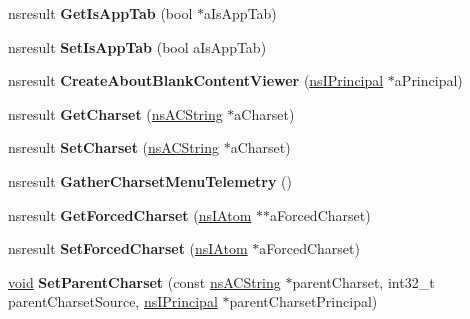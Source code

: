\begin{DoxyCompactItemize}
nsresult {\bfseries Get\+Is\+App\+Tab} (bool $\ast$a\+Is\+App\+Tab)
\item 
\mbox{\label{interfacens_i_doc_shell_aa9b845470e66e95f0585145dbbcc8901}} 
nsresult {\bfseries Set\+Is\+App\+Tab} (bool a\+Is\+App\+Tab)
\item 
\mbox{\label{interfacens_i_doc_shell_a74c3cb3554a9092a635aa0bacf7ef221}} 
nsresult {\bfseries Create\+About\+Blank\+Content\+Viewer} (\hyperlink{interfacens_i_supports}{ns\+I\+Principal} $\ast$a\+Principal)
\item 
\mbox{\label{interfacens_i_doc_shell_a3b0b28c844504e214ace3b7b61ace32b}} 
nsresult {\bfseries Get\+Charset} (\hyperlink{structns_c_string_container}{ns\+A\+C\+String} $\ast$a\+Charset)
\item 
\mbox{\label{interfacens_i_doc_shell_aa5fd925f68a4378022005736f7f0443b}} 
nsresult {\bfseries Set\+Charset} (\hyperlink{structns_c_string_container}{ns\+A\+C\+String} $\ast$a\+Charset)
\item 
\mbox{\label{interfacens_i_doc_shell_a5869a8d431f17d841cab3b697f4e471d}} 
nsresult {\bfseries Gather\+Charset\+Menu\+Telemetry} ()
\item 
\mbox{\label{interfacens_i_doc_shell_a380dbbae160a60109cda7cede34223a9}} 
nsresult {\bfseries Get\+Forced\+Charset} (\hyperlink{interfacens_i_supports}{ns\+I\+Atom} $\ast$$\ast$a\+Forced\+Charset)
\item 
\mbox{\label{interfacens_i_doc_shell_a40d73625f3cd9154d7554bf626d3fe76}} 
nsresult {\bfseries Set\+Forced\+Charset} (\hyperlink{interfacens_i_supports}{ns\+I\+Atom} $\ast$a\+Forced\+Charset)
\item 
\mbox{\label{interfacens_i_doc_shell_a8f8a22c9b94fea128703e6f09e95ee1a}} 
\hyperlink{interfacevoid}{void} {\bfseries Set\+Parent\+Charset} (const \hyperlink{structns_c_string_container}{ns\+A\+C\+String} $\ast$parent\+Charset, int32\+\_\+t parent\+Charset\+Source, \hyperlink{interfacens_i_supports}{ns\+I\+Principal} $\ast$parent\+Charset\+Principal)
\item 
$$
\end{DoxyCompactItemize}
